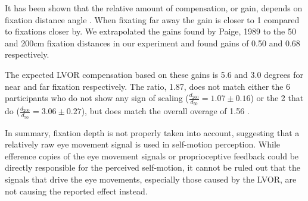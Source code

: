 It has been shown that the relative amount of compensation, or gain, depends on fixation distance angle \cite{paige1989, busettini1994,paige1998}. When fixating far away the gain is closer to 1 compared to fixations closer by. We extrapolated the gains found by Paige, 1989 to the 50 and 200cm fixation distances in our experiment and found gains of 0.50 and 0.68 respectively.

The expected LVOR compensation based on these gains is 5.6 and 3.0 degrees for near and far fixation respectively. The ratio, 1.87, does not match either the 6 participants who do not show any sign of scaling ($\frac{d_{200}}{d_{50}} = 1.07 \pm 0.16$) or the 2 that do ($\frac{d_{200}}{d_{50}} = 3.06 \pm 0.27$), but does match the overall overage of  1.56 .

In summary, fixation depth is not properly taken into account, suggesting that a relatively raw eye movement signal is used in self-motion perception. While efference copies of the eye movement signals or proprioceptive feedback could be directly responsible for the perceived self-motion, it cannot be ruled out that the signals that drive the eye movements, especially those caused by the LVOR, are not causing the reported effect instead.
